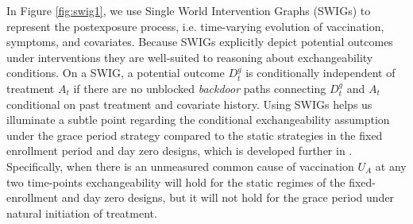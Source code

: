 \begin{appendices}
\begin{refsection}
    In Figure \ref{fig:swig1}, we use Single World Intervention Graphs (SWIGs) to represent the postexposure process, i.e. time-varying evolution of vaccination, symptoms, and covariates. Because SWIGs explicitly depict potential outcomes under interventions they are well-suited to reasoning about exchangeability conditions. On a SWIG, a potential outcome $D^g_t$ is conditionally independent of treatment $A_t$ if there are no unblocked \textit{backdoor} paths connecting $D^g_t$ and $A_t$ conditional on past treatment and covariate history. Using SWIGs helps us illuminate a subtle point regarding the conditional exchangeability assumption under the grace period strategy compared to the static strategies in the fixed enrollment period and day zero designs, which is developed further in \cite{wanis_role_2022}. Specifically, when there is an unmeasured common cause of vaccination $U_A$ at any two time-points exchangeability will hold for the static regimes of the fixed-enrollment and day zero designs, but it will not hold for the grace period under natural initiation of treatment. 

    \begin{figure}[p]
        \centering
        \begin{subfigure}{\linewidth}
            \centering
\end{subfigure}
\end{figure}
\end{refsection}
\end{appendices}
